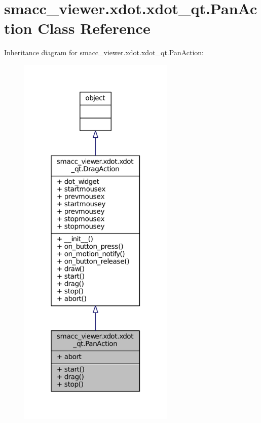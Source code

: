 \hypertarget{classsmacc__viewer_1_1xdot_1_1xdot__qt_1_1PanAction}{}\section{smacc\+\_\+viewer.\+xdot.\+xdot\+\_\+qt.\+Pan\+Action Class Reference}
\label{classsmacc__viewer_1_1xdot_1_1xdot__qt_1_1PanAction}


Inheritance diagram for smacc\+\_\+viewer.\+xdot.\+xdot\+\_\+qt.\+Pan\+Action\+:
\nopagebreak
\begin{figure}[H]
\begin{center}
\leavevmode
\includegraphics[width=211pt]{classsmacc__viewer_1_1xdot_1_1xdot__qt_1_1PanAction__inherit__graph}
\end{center}
\end{figure}


